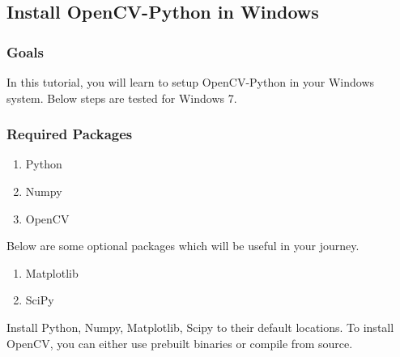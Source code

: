 \documentclass[letterpaper,10pt,english]{sphinxmanual}
\begin{document}
\subsection{Install OpenCV-Python in Windows}
\label{py_tutorials/py_setup/py_setup_in_windows/py_setup_in_windows:install-opencv-python-in-windows}\label{py_tutorials/py_setup/py_setup_in_windows/py_setup_in_windows::doc}\label{py_tutorials/py_setup/py_setup_in_windows/py_setup_in_windows:id1}

\subsubsection{Goals}
\label{py_tutorials/py_setup/py_setup_in_windows/py_setup_in_windows:goals}
In this tutorial, you will learn to setup OpenCV-Python in your Windows system. Below steps are tested for Windows 7.


\subsubsection{Required Packages}
\label{py_tutorials/py_setup/py_setup_in_windows/py_setup_in_windows:required-packages}\begin{enumerate}
\item {} 
Python

\item {} 
Numpy

\item {} 
OpenCV

\end{enumerate}

Below are some optional packages which will be useful in your journey.
\begin{enumerate}
\item {} 
Matplotlib

\item {} 
SciPy

\end{enumerate}

Install Python, Numpy, Matplotlib, Scipy to their default locations. To install OpenCV, you can either use prebuilt binaries or compile from source.
\end{document}
